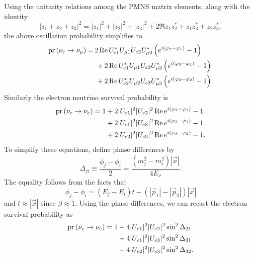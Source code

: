 Using the unitarity relations among the PMNS matrix elements, along with the
identity
\begin{equation}
  |z_1+z_2+z_3|^2=|z_1|^2+|z_2|^2+|z_3|^2
                  +2\Re{z_1z_2^*+z_1z_3^*+z_2z_3^*},
\end{equation}
the above oscillation probability simplifies to
\begin{equation}
  \begin{aligned}
    \pr{\nu_e\to\nu_\mu}=&
    \,2\Re{U_{e1}^*U_{\mu 1}U_{e2}U_{\mu 2}^*\left(e^{i(\phi_2-\phi_1)}-1\right)}
     \\&~+
    2\Re{U_{e1}^*U_{\mu 1}U_{e3}U_{\mu 3}^*\left(e^{i(\phi_3-\phi_1)}-1\right)}
     \\&~+
    2\Re{U_{e2}^*U_{\mu 2}U_{e3}U_{\mu 3}^*\left(e^{i(\phi_3-\phi_2)}-1\right)}
     .
  \end{aligned}
\end{equation}
Similarly the electron neutrino survival probability is
\begin{equation}
  \begin{aligned}
    \pr{\nu_e\to\nu_e}=1&+2|U_{e1}|^2|U_{e2}|^2\Re{e^{i(\phi_2-\phi_1)}-1} \\
                        &+2|U_{e1}|^2|U_{e3}|^2\Re{e^{i(\phi_3-\phi_1)}-1} \\
                        &+2|U_{e2}|^2|U_{e3}|^2\Re{e^{i(\phi_3-\phi_2)}-1}.
  \end{aligned}
\end{equation}
To simplify these equations, define phase differences by
\begin{equation}
  \label{eq:phase}
  \Delta_{ji}\equiv\frac{\phi_j-\phi_i}{2}
                  =\frac{(m_j^2-m_i^2)|\vec{x}|}{4E_\nu}.
\end{equation}
The equality follows from the facts that
\begin{equation}
  \phi_j-\phi_i=(E_j-E_i)t-(|\vec{p}_1|-|\vec{p}_2|)|\vec{x}|
\end{equation}
and $t\approx|\vec{x}|$ since $\beta\approx1$.
Using the phase differences, we can recast the electron survival probability as
\begin{equation}
  \label{eq:esurv}
  \begin{aligned}
    \pr{\nu_e\to\nu_e}=1&-4|U_{e1}|^2|U_{e2}|^2\sin^2\Delta_{21} \\
                        &-4|U_{e1}|^2|U_{e3}|^2\sin^2\Delta_{31} \\
                        &-4|U_{e2}|^2|U_{e3}|^2\sin^2\Delta_{32}.
  \end{aligned}
\end{equation}
